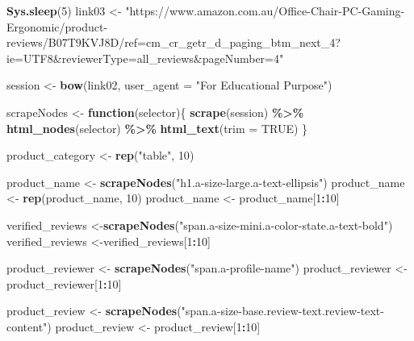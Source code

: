 \documentclass[
]{article}
\newenvironment{Shaded}{\begin{snugshade}}{\end{snugshade}}
\newcommand{\AttributeTok}[1]{\textcolor[rgb]{0.13,0.29,0.53}{#1}}
\newcommand{\ConstantTok}[1]{\textcolor[rgb]{0.56,0.35,0.01}{#1}}
\newcommand{\ControlFlowTok}[1]{\textcolor[rgb]{0.13,0.29,0.53}{\textbf{#1}}}
\newcommand{\DecValTok}[1]{\textcolor[rgb]{0.00,0.00,0.81}{#1}}
\newcommand{\FunctionTok}[1]{\textcolor[rgb]{0.13,0.29,0.53}{\textbf{#1}}}
\newcommand{\NormalTok}[1]{#1}
\newcommand{\OtherTok}[1]{\textcolor[rgb]{0.56,0.35,0.01}{#1}}
\newcommand{\SpecialCharTok}[1]{\textcolor[rgb]{0.81,0.36,0.00}{\textbf{#1}}}
\newcommand{\StringTok}[1]{\textcolor[rgb]{0.31,0.60,0.02}{#1}}
\begin{document}
\begin{Shaded}
\begin{Highlighting}[]
   \FunctionTok{Sys.sleep}\NormalTok{(}\DecValTok{5}\NormalTok{)}
\NormalTok{link03 }\OtherTok{\textless{}{-}} \StringTok{"https://www.amazon.com.au/Office{-}Chair{-}PC{-}Gaming{-}Ergonomic/product{-}reviews/B07T9KVJ8D/ref=cm\_cr\_getr\_d\_paging\_btm\_next\_4?ie=UTF8\&reviewerType=all\_reviews\&pageNumber=4"}


\NormalTok{  session }\OtherTok{\textless{}{-}} \FunctionTok{bow}\NormalTok{(link02,}
               \AttributeTok{user\_agent =} \StringTok{"For Educational Purpose"}\NormalTok{)}

\NormalTok{  scrapeNodes }\OtherTok{\textless{}{-}} \ControlFlowTok{function}\NormalTok{(selector)\{}
    \FunctionTok{scrape}\NormalTok{(session) }\SpecialCharTok{\%\textgreater{}\%}
      \FunctionTok{html\_nodes}\NormalTok{(selector) }\SpecialCharTok{\%\textgreater{}\%}
      \FunctionTok{html\_text}\NormalTok{(}\AttributeTok{trim =} \ConstantTok{TRUE}\NormalTok{)}
\NormalTok{  \}}

\NormalTok{  product\_category }\OtherTok{\textless{}{-}} \FunctionTok{rep}\NormalTok{(}\StringTok{"table"}\NormalTok{, }\DecValTok{10}\NormalTok{)}

\NormalTok{  product\_name }\OtherTok{\textless{}{-}} \FunctionTok{scrapeNodes}\NormalTok{(}\StringTok{"h1.a{-}size{-}large.a{-}text{-}ellipsis"}\NormalTok{)}
\NormalTok{  product\_name }\OtherTok{\textless{}{-}} \FunctionTok{rep}\NormalTok{(product\_name, }\DecValTok{10}\NormalTok{)}
\NormalTok{  product\_name }\OtherTok{\textless{}{-}}\NormalTok{ product\_name[}\DecValTok{1}\SpecialCharTok{:}\DecValTok{10}\NormalTok{]}
  
\NormalTok{  verified\_reviews }\OtherTok{\textless{}{-}}\FunctionTok{scrapeNodes}\NormalTok{(}\StringTok{"span.a{-}size{-}mini.a{-}color{-}state.a{-}text{-}bold"}\NormalTok{)}
\NormalTok{  verified\_reviews }\OtherTok{\textless{}{-}}\NormalTok{verified\_reviews[}\DecValTok{1}\SpecialCharTok{:}\DecValTok{10}\NormalTok{]}
  
\NormalTok{  product\_reviewer }\OtherTok{\textless{}{-}} \FunctionTok{scrapeNodes}\NormalTok{(}\StringTok{"span.a{-}profile{-}name"}\NormalTok{)}
\NormalTok{  product\_reviewer }\OtherTok{\textless{}{-}}\NormalTok{ product\_reviewer[}\DecValTok{1}\SpecialCharTok{:}\DecValTok{10}\NormalTok{]}
  
\NormalTok{  product\_review }\OtherTok{\textless{}{-}} \FunctionTok{scrapeNodes}\NormalTok{(}\StringTok{"span.a{-}size{-}base.review{-}text.review{-}text{-}content"}\NormalTok{)}
\NormalTok{  product\_review }\OtherTok{\textless{}{-}}\NormalTok{ product\_review[}\DecValTok{1}\SpecialCharTok{:}\DecValTok{10}\NormalTok{]}
  

\end{Highlighting}
\end{Shaded}
\end{document}
